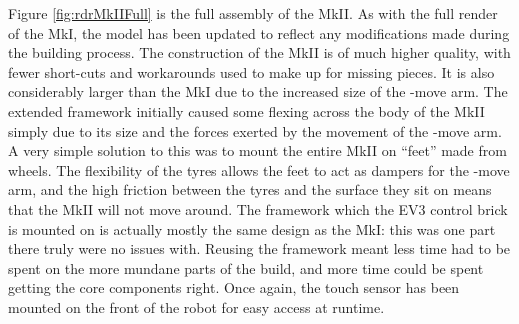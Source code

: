 \documentclass{report}
\newcommand{\move}[1]{\uppercase{\texttt{\formatmovesnospace{#1}}}-move}
\begin{document}
    Figure \ref{fig:rdrMkIIFull} is the full assembly of the MkII. As with the full render of the MkI, the model has been updated to reflect any modifications made during the building process. The construction of the MkII is of much higher quality, with fewer short-cuts and workarounds used to make up for missing pieces. It is also considerably larger than the MkI due to the increased size of the \move{x} arm. The extended framework initially caused some flexing across the body of the MkII simply due to its size and the forces exerted by the movement of the \move{x} arm. A very simple solution to this was to mount the entire MkII on \enquote{feet} made from wheels. The flexibility of the tyres allows the feet to act as dampers for the \move{x} arm, and the high friction between the tyres and the surface they sit on means that the MkII will not move around. The framework which the EV3 control brick is mounted on is actually mostly the same design as the MkI: this was one part there truly were no issues with. Reusing the framework meant less time had to be spent on the more mundane parts of the build, and more time could be spent getting the core components right. Once again, the touch sensor has been mounted on the front of the robot for easy access at runtime.
    
\end{document}
